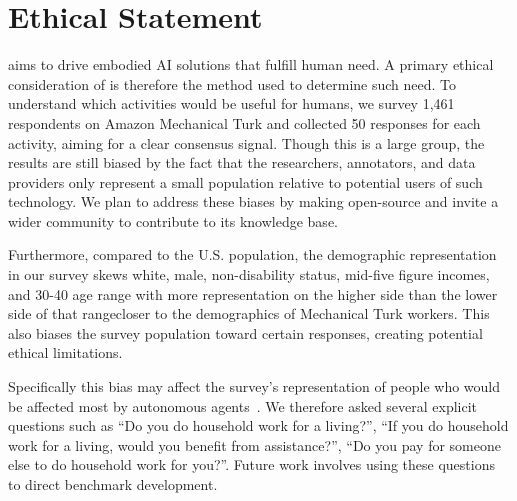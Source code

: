 
\section{Ethical Statement}

\benchmark aims to drive embodied AI solutions that fulfill human need. A primary ethical consideration of \benchmark is therefore the method used to determine such need. To understand which activities would be useful for humans, we survey 1,461 respondents on Amazon Mechanical Turk and collected 50 responses for each activity, aiming for a clear consensus signal. Though this is a large group, the results are still biased by the fact that the researchers, annotators, and data providers only represent a small population relative to potential users of such technology. We plan to address these biases by making \dataset open-source and invite a wider community to contribute to its knowledge base. 

Furthermore, compared to the U.S. population, the demographic representation in our survey skews white, male, non-disability status, mid-five figure incomes, and 30-40 age range with more representation on the higher side than the lower side of that range\textemdash closer to the demographics of Mechanical Turk workers. This also biases the survey population toward certain responses, creating potential ethical limitations. 

Specifically this bias may affect the survey's representation of people who would be affected most by autonomous agents~\cite{mckinsey2019automation}. We therefore asked several explicit questions such as ``Do you do household work for a living?'', ``If you do household work for a living, would you benefit from assistance?'',  ``Do you pay for someone else to do household work for you?''. Future work involves using these questions to direct benchmark development. 


